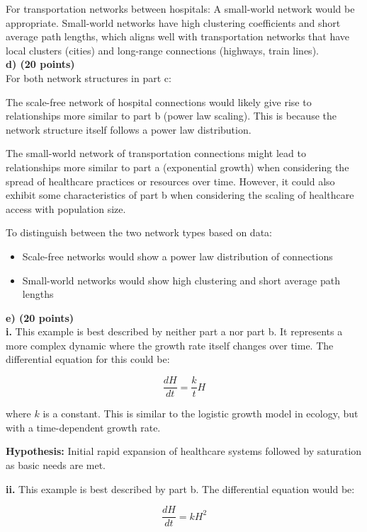 \documentclass{article}
\begin{document}
For transportation networks between hospitals:
A small-world network would be appropriate. Small-world networks have high clustering coefficients and short average path lengths, which aligns well with transportation networks that have local clusters (cities) and long-range connections (highways, train lines). \\

\textbf{d) (20 points)}\\

For both network structures in part c:

The scale-free network of hospital connections would likely give rise to relationships more similar to part b (power law scaling). This is because the network structure itself follows a power law distribution.

The small-world network of transportation connections might lead to relationships more similar to part a (exponential growth) when considering the spread of healthcare practices or resources over time. However, it could also exhibit some characteristics of part b when considering the scaling of healthcare access with population size.

To distinguish between the two network types based on data:
\begin{itemize}
    \item Scale-free networks would show a power law distribution of connections
    \item Small-world networks would show high clustering and short average path lengths
\end{itemize}

\textbf{e) (20 points)}\\

\textbf{i. }This example is best described by neither part a nor part b. It represents a more complex dynamic where the growth rate itself changes over time. The differential equation for this could be:

$$\frac{dH}{dt} = \frac{k}{t}H$$

where $k$ is a constant. This is similar to the logistic growth model in ecology, but with a time-dependent growth rate.

\textbf{Hypothesis:} Initial rapid expansion of healthcare systems followed by saturation as basic needs are met.

\textbf{ii.} This example is best described by part b. The differential equation would be:

$$\frac{dH}{dt} = kH^2$$
\end{document}
